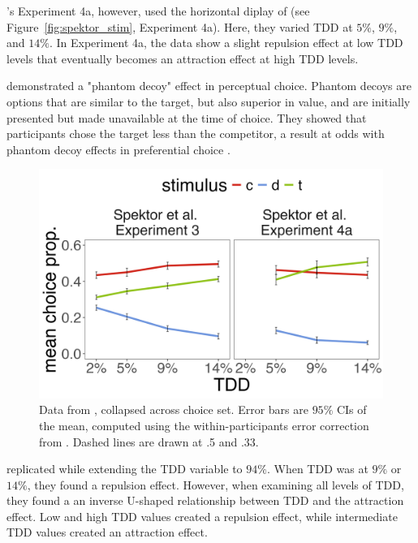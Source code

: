\textcite{spektorWhenGoodLooks2018b}'s Experiment 4a, however, used the horizontal diplay of \textcite{trueblood2013not} (see Figure~\ref{fig:spektor_stim}, Experiment 4a). Here, they varied TDD at $5\%$, $9\%$, and $14\%$. In Experiment 4a, the data show a slight repulsion effect at low TDD levels that eventually becomes an attraction effect at high TDD levels. 

\textcite{truebloodPhantomDecoyEffect2017c} demonstrated a "phantom decoy" effect in perceptual choice. Phantom decoys are options that are similar to the target, but also superior in value, and are initially presented but made unavailable at the time of choice. They showed that participants chose the target less than the competitor, a result at odds with phantom decoy effects in preferential choice \parencite{pratkanisBriefHistoryResearch1992b,pettiboneExaminingModelsNondominated2000}. 

\begin{figure}
   \includegraphics[width=\linewidth]{figures/spektor_data_collapsed.jpeg}
   \caption{Data from \textcite{spektorWhenGoodLooks2018b}, collapsed across choice set. Error bars are $95\%$ CIs of the mean, computed using the within-participants error correction from \textcite{morey2008confidence}. Dashed lines are drawn at .5 and .33.}
   \label{fig:spektor_data} %
\end{figure}

\textcite{liaoInfluenceDistanceDecoy2021} replicated \textcite{spektorWhenGoodLooks2018b} while extending the TDD variable to $94\%$. When TDD was at $9\%$ or $14\%$, they found a repulsion effect. However, when examining all levels of TDD, they found a an inverse U-shaped relationship between TDD and the attraction effect. Low and high TDD values created a repulsion effect, while intermediate TDD values created an attraction effect. 

